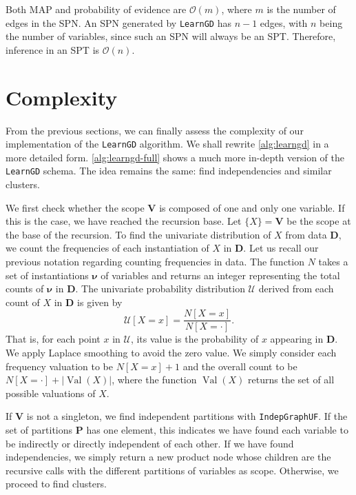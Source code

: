\documentclass{amsart}
\DeclareMathOperator*{\Val}{\text{Val}}
\theoremstyle{plain}
\numberwithin{equation}{section}
\newcommand{\set}[1]{\mathbf{#1}}
\newcommand{\bigo}{\mathcal{O}}
\newcommand{\code}[1]{\lstinline[mathescape=true]{#1}}
\begin{document}
Both MAP and probability of evidence are $\bigo(m)$, where $m$ is the number of edges in the SPN\@.
An SPN generated by \code{LearnGD} has $n-1$ edges, with $n$ being the number of variables, since
such an SPN will always be an SPT\@. Therefore, inference in an SPT is $\bigo(n)$.

\section{Complexity}

From the previous sections, we can finally assess the complexity of our implementation of the
\code{LearnGD} algorithm. We shall rewrite \autoref{alg:learngd} in a more detailed form.
\autoref{alg:learngd-full} shows a much more in-depth version of the \code{LearnGD} schema. The
idea remains the same: find independencies and similar clusters.

We first check whether the scope $\set{V}$ is composed of one and only one variable. If this is the
case, we have reached the recursion base. Let $\{X\}=\set{V}$ be the scope at the base of the
recursion. To find the univariate distribution of $X$ from data $\set{D}$, we count the frequencies
of each instantiation of $X$ in $\set{D}$. Let us recall our previous notation regarding counting
frequencies in data. The function $N$ takes a set of instantiations $\set{\nu}$ of variables and
returns an integer representing the total counts of $\set{\nu}$ in $\set{D}$. The univariate
probability distribution $\mathcal{U}$ derived from each count of $X$ in $\set{D}$ is given by
\begin{equation*}
  \mathcal{U}[X=x] = \frac{N[X=x]}{N[X=\cdot]}.
\end{equation*}
That is, for each point $x$ in $\mathcal{U}$, its value is the probability of $x$ appearing in
$\set{D}$. We apply Laplace smoothing to avoid the zero value. We simply consider each frequency
valuation to be $N[X=x]+1$ and the overall count to be $N[X=\cdot]+|\Val(X)|$, where the function
$\Val(X)$ returns the set of all possible valuations of $X$.

If $\set{V}$ is not a singleton, we find independent partitions with \code{IndepGraphUF}.  If the
set of partitions $\set{P}$ has one element, this indicates we have found each variable to be
indirectly or directly independent of each other. If we have found independencies, we simply return
a new product node whose children are the recursive calls with the different partitions of
variables as scope. Otherwise, we proceed to find clusters.
\end{document}
